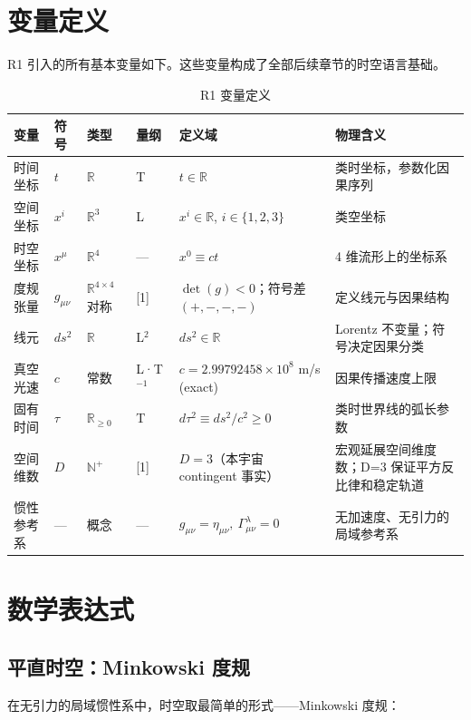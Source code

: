 \section{变量定义}

R1 引入的所有基本变量如下。这些变量构成了全部后续章节的时空语言基础。

\begin{table}[h]
\centering
\small
\begin{tabular}{p{2cm}p{1.8cm}p{2cm}p{1.5cm}p{3cm}p{4cm}}
\toprule
\textbf{变量} & \textbf{符号} & \textbf{类型} & \textbf{量纲} & \textbf{定义域} & \textbf{物理含义} \\
\midrule
时间坐标 & $t$ & $\mathbb{R}$ & T & $t \in \mathbb{R}$ & 类时坐标，参数化因果序列 \\
空间坐标 & $x^i$ & $\mathbb{R}^3$ & L & $x^i \in \mathbb{R}$, $i \in \{1,2,3\}$ & 类空坐标 \\
时空坐标 & $x^\mu$ & $\mathbb{R}^4$ & — & $x^0 \equiv ct$ & 4 维流形上的坐标系 \\
度规张量 & $g_{\mu\nu}$ & $\mathbb{R}^{4\times4}$ 对称 & [1] & $\det(g) < 0$；符号差 $(+,-,-,-)$ & 定义线元与因果结构 \\
线元 & $ds^2$ & $\mathbb{R}$ & L$^2$ & $ds^2 \in \mathbb{R}$ & Lorentz 不变量；符号决定因果分类 \\
真空光速 & $c$ & 常数 & L·T$^{-1}$ & $c = 2.99792458 \times 10^8$ m/s (exact) & 因果传播速度上限 \\
固有时间 & $\tau$ & $\mathbb{R}_{\ge 0}$ & T & $d\tau^2 \equiv ds^2/c^2 \ge 0$ & 类时世界线的弧长参数 \\
空间维数 & $D$ & $\mathbb{N}^+$ & [1] & $D = 3$（本宇宙 contingent 事实） & 宏观延展空间维度数；D=3 保证平方反比律和稳定轨道 \\
惯性参考系 & — & 概念 & — & $g_{\mu\nu}=\eta_{\mu\nu},\ \Gamma^\lambda_{\mu\nu}=0$ & 无加速度、无引力的局域参考系 \\
\bottomrule
\end{tabular}
\caption{R1 变量定义}
\end{table}

\section{数学表达式}

\subsection{平直时空：Minkowski 度规}

在无引力的局域惯性系中，时空取最简单的形式——Minkowski 度规：

